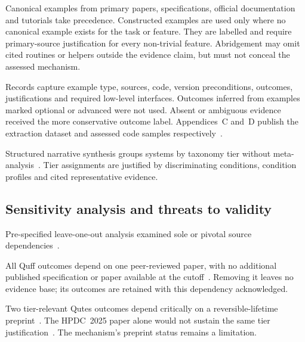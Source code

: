 Canonical examples from primary papers, specifications, official documentation and tutorials take precedence.
Constructed examples are used only where no canonical example exists for the task or feature.
They are labelled and require primary-source justification for every non-trivial feature.
Abridgement may omit cited routines or helpers outside the evidence claim, but must not conceal the assessed mechanism.

Records capture example type, sources, code, version preconditions, outcomes, justifications and required low-level interfaces.
Outcomes inferred from examples marked optional or advanced were not used.
Absent or ambiguous evidence received the more conservative outcome label.
Appendices~C and~D publish the extraction dataset and assessed code samples respectively~\cite{kavadias2026qplSurveySupplementary}.

Structured narrative synthesis groups systems by taxonomy tier without meta-analysis~\cite{KitchenhamCharters2007SLR}.
Tier assignments are justified by discriminating conditions, condition profiles and cited representative evidence.

\subsection{Sensitivity analysis and threats to validity}\label{subsec:methodology:sensitivity}
Pre-specified leave-one-out analysis examined sole or pivotal source dependencies~\cite{kavadias2026qplSurveyProtocol}.

All Quff outcomes depend on one peer-reviewed paper, with no additional published specification or paper available at the cutoff~\cite{wright2024quff}.
Removing it leaves no evidence base; its outcomes are retained with this dependency acknowledged.

Two tier-relevant Qutes outcomes depend critically on a reversible-lifetime preprint~\cite{reversiblelifetime2026}.
The HPDC~2025 paper alone would not sustain the same tier justification~\cite{faro2025qutes}.
The mechanism's preprint status remains a limitation.

